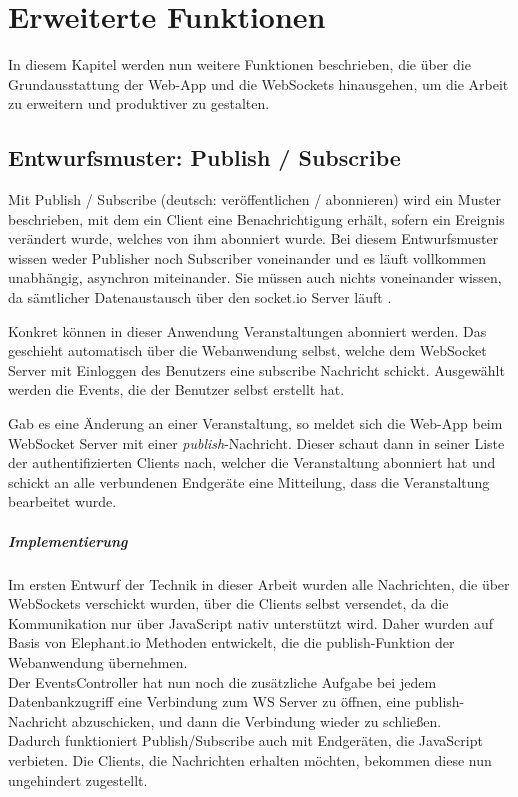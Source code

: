 \chapter{Erweiterte Funktionen}
In diesem Kapitel werden nun weitere Funktionen beschrieben, die über die Grundausstattung der Web-App und die WebSockets hinausgehen, um die Arbeit zu erweitern und produktiver zu gestalten. 


\section{Entwurfsmuster: Publish / Subscribe}
Mit Publish / Subscribe (deutsch: veröffentlichen / abonnieren) wird ein Muster beschrieben, mit dem ein Client eine Benachrichtigung erhält, sofern ein Ereignis verändert wurde, welches von ihm abonniert wurde. Bei diesem Entwurfsmuster wissen weder Publisher noch Subscriber voneinander und es läuft vollkommen unabhängig, asynchron miteinander. Sie müssen auch nichts voneinander wissen, da sämtlicher Datenaustausch über den socket.io Server läuft \cite{autobahn.js:pubsub}.\par

Konkret können in dieser Anwendung Veranstaltungen abonniert werden. Das geschieht automatisch über die Webanwendung selbst, welche dem WebSocket Server mit Einloggen des Benutzers eine subscribe Nachricht schickt. Ausgewählt werden die Events, die der Benutzer selbst erstellt hat. 

Gab es eine Änderung an einer Veranstaltung, so meldet sich die Web-App beim WebSocket Server mit einer \emph{publish}-Nachricht. Dieser schaut dann in seiner Liste der authentifizierten Clients nach, welcher die Veranstaltung abonniert hat und schickt an alle verbundenen Endgeräte eine Mitteilung, dass die Veranstaltung bearbeitet wurde.\par

\paragraph{Implementierung}
Im ersten Entwurf der Technik in dieser Arbeit wurden alle Nachrichten, die über WebSockets verschickt wurden, über die Clients selbst versendet, da die Kommunikation nur über JavaScript nativ unterstützt wird. Daher wurden auf Basis von Elephant.io Methoden entwickelt, die die publish-Funktion der Webanwendung übernehmen.\\
Der EventsController hat nun noch die zusätzliche Aufgabe bei jedem Datenbankzugriff eine Verbindung zum WS Server zu öffnen, eine publish-Nachricht abzuschicken, und dann die Verbindung wieder zu schließen.\\
Dadurch funktioniert Publish/Subscribe auch mit Endgeräten, die JavaScript verbieten. Die Clients, die Nachrichten erhalten möchten, bekommen diese nun ungehindert zugestellt.\par

